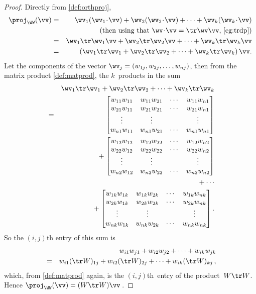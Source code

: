 \begin{proof} 
Directly from \cref{def:orthproj},
\begin{eqnarray*}
\proj_\WW(\vv)&=&\wv_1(\wv_1\cdot\vv)+\wv_2(\wv_2\cdot\vv)+\cdots+\wv_k(\wv_k\cdot\vv)
\\&&(\text{then using that \(\wv\cdot\vv=\tr\wv\vv\), \cref{eg:trdp}})
\\&=&\wv_1\tr\wv_1\vv+\wv_2\tr\wv_2\vv+\cdots+\wv_k\tr\wv_k\vv
\\&=&\left(\wv_1\tr\wv_1+\wv_2\tr\wv_2+\cdots+\wv_k\tr\wv_k\right)\vv.
\end{eqnarray*}
Let the components of the vector \(\wv_j=(w_{1j},w_{2j},\ldots,w_{nj})\), then from the matrix product \cref{def:matprod}, the \(k\)~products in the sum 
\def\ww#1{\begin{bmatrix} 
w_{1#1}w_{1#1}& w_{1#1}w_{2#1}&\cdots& w_{1#1}w_{n#1} \\
w_{2#1}w_{1#1}& w_{2#1}w_{2#1}&\cdots& w_{2#1}w_{n#1} \\
\vdots&\vdots&&\vdots\\
w_{n#1}w_{1#1}& w_{n#1}w_{2#1}&\cdots& w_{n#1}w_{n#1} 
\end{bmatrix}}
\begin{eqnarray*}
&&\wv_1\tr\wv_1+\wv_2\tr\wv_2+\cdots+\wv_k\tr\wv_k
\\&=& \ww1
\\&&{}+\ww2
\\&&{}+\cdots
\\&&{}+\ww k.
\end{eqnarray*}
So the \((i,j)\)th entry of this sum is
\begin{eqnarray*}
&&w_{i1}w_{j1}+w_{i2}w_{j2}+\cdots+w_{ik}w_{jk}
\\&=&w_{i1}(\tr W)_{1j}+w_{i2}(\tr W)_{2j}+\cdots+w_{ik}(\tr W)_{kj} \,,
\end{eqnarray*}
which, from \cref{def:matprod} again, is the \((i,j)\)th~entry of the product~\(W\tr W\).
Hence \(\proj_\WW(\vv)=(W\tr W)\vv\)\,.
\end{proof}



